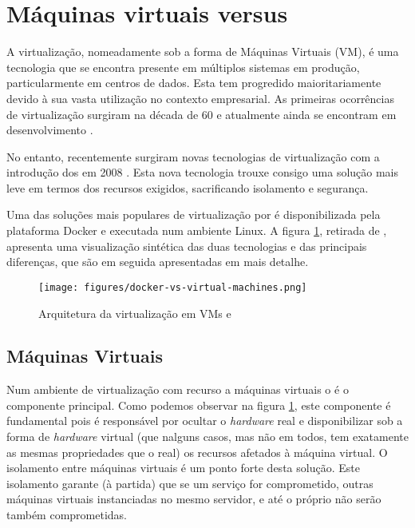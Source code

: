 
\section{Máquinas virtuais versus {\conts}}

A virtualização, nomeadamente sob a forma de Máquinas Virtuais (VM), é uma tecnologia que se encontra presente 
em múltiplos sistemas em produção, particularmente em centros de dados. Esta tem progredido maioritariamente devido à sua vasta utilização no contexto empresarial. As primeiras ocorrências de virtualização surgiram na década de 60 e atualmente ainda se encontram em desenvolvimento \cite{7095802}.

No entanto, recentemente surgiram novas tecnologias de virtualização com a intro\-du\-ção dos  {\linconts} em 2008 \cite{wiki-lxc}. 
Esta nova tecnologia trouxe consigo uma solução mais leve em termos dos recursos exigidos, sacrificando isolamento e segurança.
 
Uma das soluções mais populares de virtualização por {\conts} é disponibilizada pela plataforma Docker \cite{docker} e executada num ambiente Linux. A figura \ref{fig:vms-conts}, retirada de \cite{image-vms-conts}, apresenta uma visualização sintética das duas tecnologias e das principais diferenças, que são em seguida apresentadas em mais detalhe.

\begin{figure}[h!]
	\centering
	\texttt{[image: figures/docker-vs-virtual-machines.png]}
	\caption{Arquitetura da virtualização em VMs e {\conts}} \cite{image-vms-conts}
	\label{fig:vms-conts}
\end{figure}


\subsection{Máquinas Virtuais}
Num ambiente de virtualização com recurso a máquinas virtuais o {\hiper} é o componente principal. Como podemos observar na figura \ref{fig:vms-conts}, este componente é fundamental pois é responsável por ocultar o \textit{hardware} real e disponibilizar sob a forma de \textit{hardware} virtual (que nalguns casos, mas não em todos, tem exatamente as mesmas propriedades que o real) os recursos afetados à máquina virtual. O isolamento entre máquinas virtuais é um ponto forte desta solução. Este isolamento garante (à partida) que se um serviço for comprometido, outras máquinas virtuais instanciadas no mesmo servidor, e até o próprio {\hiper} não serão também comprometidas. 

